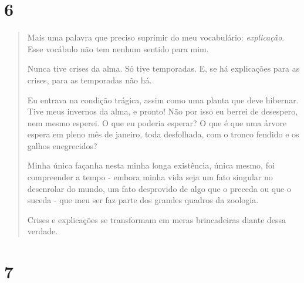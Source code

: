 \section{6}\label{section-5}

\begin{quote}
Mais uma palavra que preciso suprimir do meu vocabulário:
\emph{explicação}. Esse vocábulo não tem nenhum sentido para mim.

Nunca tive crises da alma. Só tive temporadas. E, se há explicações para
as crises, para as temporadas não há.

Eu entrava na condição trágica, assim como uma planta que deve hibernar.
Tive meus invernos da alma, e pronto! Não por isso eu berrei de
desespero, nem mesmo esperei. O que eu poderia esperar? O que é que uma
árvore espera em pleno mês de janeiro, toda desfolhada, com o tronco
fendido e os galhos enegrecidos?

Minha única façanha nesta minha longa existência, única mesmo, foi
compreender a tempo - embora minha vida seja um fato singular no
desenrolar do mundo, um fato desprovido de algo que o preceda ou que o
suceda - que meu ser faz parte dos grandes quadros da zoologia.

Crises e explicações se transformam em meras brincadeiras diante dessa
verdade.
\end{quote}

\section{7}\label{section-6}

